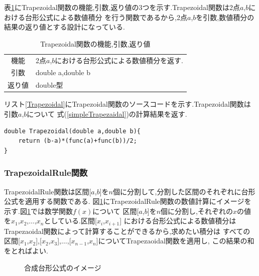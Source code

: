 \documentclass[dvipdfmx]{jarticle}
\begin{document}
    表\ref{Trapezoidaltable}にTrapezoidal関数の機能,引数,返り値の3つを示す.Trapezoidal関数は2点$a$,$b$における台形公式による数値積分
    を行う関数であるから,2点$a$,$b$を引数,数値積分の結果の返り値とする設計になっている.

    \begin{table}[H]
      \caption{Trapezoidal関数の機能,引数,返り値}
      \label{Trapezoidaltable}
      \begin{center}
          \begin{tabular}{c|l}\hline
        機能 & 2点$a$,$b$における台形公式による数値積分を返す.\\
        引数 & double a,double b\\
        返り値 & double型 \\ \hline
          \end{tabular}
      \end{center}
      \end{table}

      リスト\ref{Trapezoidal}にTrapezoidal関数のソースコードを示す.Trapezoidal関数は引数$a$,$b$について
      式(\ref{simpleTrapezaidal})の計算結果を返す.
      \begin{lstlisting}[basicstyle=\ttfamily\footnotesize, frame=single,label=Trapezoidal,caption=Trapezoidal関数]
double Trapezoidal(double a,double b){
    return (b-a)*(func(a)+func(b))/2;
}
            \end{lstlisting}

    \subsubsection{TrapezoidalRule関数}
    TrapezoidalRule関数は区間[$a$,$b$]を$n$個に分割して,分割した区間のそれぞれに台形公式を適用する関数である.
    図\ref{gtrap}にTrapezoidalRule関数の数値計算にイメージを示す.図\ref{gtrap}では数学関数$f(x)$について
    区間[$a$,$b$]を$n$個に分割し,それぞれの$x$の値を$x_1$,$x_2$,$\dots$,$x_n$としている.区間[$x_i$,$x_{i+1}$]
    における台形公式による数値積分はTrapezaoidal関数によって計算することができるから,求めたい積分は
    すべての区間[$x_1$,$x_2$],[$x_2$,$x_3$],$\dots$,[$x_{n-1}$,$x_n$]についてTrapezaoidal関数を適用し,
    この結果の和をとればよい.

    \begin{figure}[H]
      \centering
\caption{合成台形公式のイメージ} 
\label{gtrap}
\end{figure}
\end{document}
